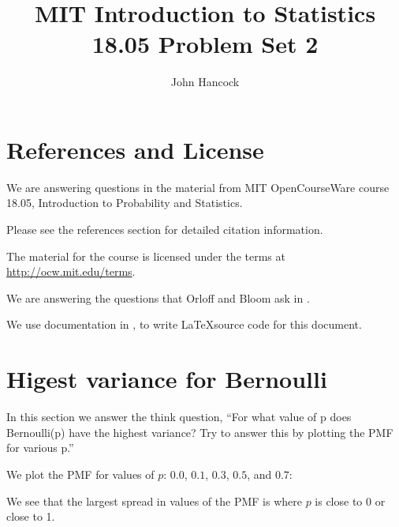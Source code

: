 \documentclass[a4paper,11pt]{article}
\author{John Hancock}
\title{MIT Introduction to Statistics 18.05 Problem Set 2 }
\begin{document}
\maketitle
\tableofcontents
\section{References and License}
We are answering questions in the material from MIT OpenCourseWare
course 18.05, Introduction to Probability and Statistics.

Please see the references section for detailed citation information.

The material for the course is licensed under the terms at
\url{http://ocw.mit.edu/terms}.

We are answering the questions that Orloff and Bloom ask in
\cite{reading5a}.

We use documentation in \cite{basicPlot}, \cite{plotGallery} to
write \LaTeX source code for this document.

\section{Higest variance for Bernoulli}
In this section we answer the think question, ``For what value of p does
Bernoulli(p) have the highest variance? Try to answer this by plotting the PMF
for various p.''

We plot the PMF for values of $p$: $0.0$, $0.1$, $0.3$, $0.5$, and $0.7$:


We see that the largest spread in values of the PMF is where $p$ is close to
0 or close to 1.

\printbibliography{}
\end{document}
